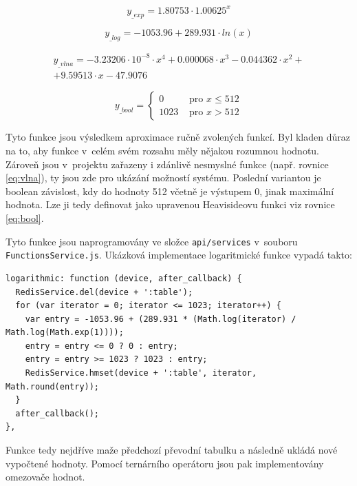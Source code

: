 \begin{equation}
	y_{\_exp} = 1.80753 \cdot 1.00625^x
	\label{eq:exp}
\end{equation}

\begin{equation}
	y_{\_log} = -1053.96 + 289.931 \cdot ln(x)
	\label{eq:log}
\end{equation}

\begin{multline}
	y_{\_vlna} = -3.23206 \cdot 10^{-8} \cdot x^4 + 0.000068 \cdot x^3 - 0.044362 \cdot x^2 + \\
				+9.59513 \cdot x - 47.9076
	\label{eq:vlna}
\end{multline}

\begin{equation}
	y_{\_bool} = \left\{
		\begin{matrix}
			0 & \mbox{ pro }x \leq 512 \\
			1023 & \mbox{ pro }x > 512
		\end{matrix}
	\right.
	\label{eq:bool}
\end{equation}

Tyto funkce jsou výsledkem aproximace ručně zvolených funkcí. Byl kladen důraz na to, aby funkce v~celém svém rozsahu měly nějakou rozumnou hodnotu. Zároveň jsou v~projektu zařazeny i zdánlivě nesmyslné funkce (např. rovnice \ref{eq:vlna}), ty jsou zde pro ukázání možností systému. Poslední variantou je boolean závislost, kdy do hodnoty 512 včetně je výstupem 0, jinak maximální hodnota. Lze ji tedy definovat jako upravenou Heavisideovu funkci viz rovnice \ref{eq:bool}.

Tyto funkce jsou naprogramovány ve složce \texttt{api/services} v~souboru \texttt{FunctionsService.js}. Ukázková implementace logaritmické funkce vypadá takto:

\begin{verbatim}
logarithmic: function (device, after_callback) {
  RedisService.del(device + ':table');
  for (var iterator = 0; iterator <= 1023; iterator++) {
    var entry = -1053.96 + (289.931 * (Math.log(iterator) / Math.log(Math.exp(1))));
    entry = entry <= 0 ? 0 : entry;
    entry = entry >= 1023 ? 1023 : entry;
    RedisService.hmset(device + ':table', iterator, Math.round(entry));
  }
  after_callback();
},
\end{verbatim}

Funkce tedy nejdříve maže předchozí převodní tabulku a následně ukládá nové vypočtené hodnoty. Pomocí ternárního operátoru \cite{ternar} jsou pak implementovány omezovače hodnot.

